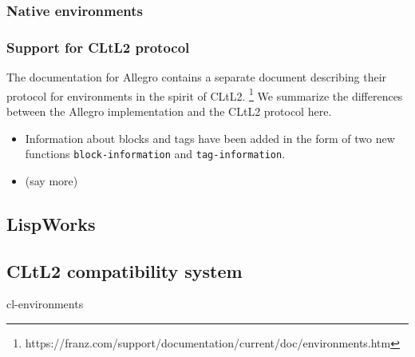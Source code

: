 \subsubsection{Native environments}

\subsubsection{Support for CLtL2 protocol}

The documentation for Allegro \commonlisp{} contains a separate
document describing their protocol for environments in the spirit of
CLtL2.%
\footnote{https://franz.com/support/documentation/current/doc/environments.htm}
We summarize the differences between the Allegro implementation and
the CLtL2 protocol here.

\begin{itemize}
\item Information about blocks and tags have been added in the form of
  two new functions \texttt{block-information} and
  \texttt{tag-information}.
\item (say more)
\end{itemize}

\subsection{LispWorks}

\subsection{CLtL2 compatibility system}

cl-environments
